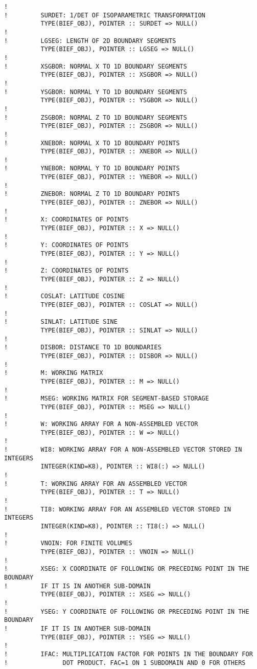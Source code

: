 \begin{lstlisting}[language=TelFortran]
!
!         SURDET: 1/DET OF ISOPARAMETRIC TRANSFORMATION
          TYPE(BIEF_OBJ), POINTER :: SURDET => NULL()
!
!         LGSEG: LENGTH OF 2D BOUNDARY SEGMENTS
          TYPE(BIEF_OBJ), POINTER :: LGSEG => NULL()
!
!         XSGBOR: NORMAL X TO 1D BOUNDARY SEGMENTS
          TYPE(BIEF_OBJ), POINTER :: XSGBOR => NULL()
!
!         YSGBOR: NORMAL Y TO 1D BOUNDARY SEGMENTS
          TYPE(BIEF_OBJ), POINTER :: YSGBOR => NULL()
!
!         ZSGBOR: NORMAL Z TO 1D BOUNDARY SEGMENTS
          TYPE(BIEF_OBJ), POINTER :: ZSGBOR => NULL()
!
!         XNEBOR: NORMAL X TO 1D BOUNDARY POINTS
          TYPE(BIEF_OBJ), POINTER :: XNEBOR => NULL()
!
!         YNEBOR: NORMAL Y TO 1D BOUNDARY POINTS
          TYPE(BIEF_OBJ), POINTER :: YNEBOR => NULL()
!
!         ZNEBOR: NORMAL Z TO 1D BOUNDARY POINTS
          TYPE(BIEF_OBJ), POINTER :: ZNEBOR => NULL()
!
!         X: COORDINATES OF POINTS
          TYPE(BIEF_OBJ), POINTER :: X => NULL()
!
!         Y: COORDINATES OF POINTS
          TYPE(BIEF_OBJ), POINTER :: Y => NULL()
!
!         Z: COORDINATES OF POINTS
          TYPE(BIEF_OBJ), POINTER :: Z => NULL()
!
!         COSLAT: LATITUDE COSINE
          TYPE(BIEF_OBJ), POINTER :: COSLAT => NULL()
!
!         SINLAT: LATITUDE SINE
          TYPE(BIEF_OBJ), POINTER :: SINLAT => NULL()
!
!         DISBOR: DISTANCE TO 1D BOUNDARIES
          TYPE(BIEF_OBJ), POINTER :: DISBOR => NULL()
!
!         M: WORKING MATRIX
          TYPE(BIEF_OBJ), POINTER :: M => NULL()
!
!         MSEG: WORKING MATRIX FOR SEGMENT-BASED STORAGE
          TYPE(BIEF_OBJ), POINTER :: MSEG => NULL()
!
!         W: WORKING ARRAY FOR A NON-ASSEMBLED VECTOR
          TYPE(BIEF_OBJ), POINTER :: W => NULL()
!
!         WI8: WORKING ARRAY FOR A NON-ASSEMBLED VECTOR STORED IN INTEGERS
          INTEGER(KIND=K8), POINTER :: WI8(:) => NULL()
!
!         T: WORKING ARRAY FOR AN ASSEMBLED VECTOR
          TYPE(BIEF_OBJ), POINTER :: T => NULL()
!
!         TI8: WORKING ARRAY FOR AN ASSEMBLED VECTOR STORED IN INTEGERS
          INTEGER(KIND=K8), POINTER :: TI8(:) => NULL()
!
!         VNOIN: FOR FINITE VOLUMES
          TYPE(BIEF_OBJ), POINTER :: VNOIN => NULL()
!
!         XSEG: X COORDINATE OF FOLLOWING OR PRECEDING POINT IN THE BOUNDARY
!         IF IT IS IN ANOTHER SUB-DOMAIN
          TYPE(BIEF_OBJ), POINTER :: XSEG => NULL()
!
!         YSEG: Y COORDINATE OF FOLLOWING OR PRECEDING POINT IN THE BOUNDARY
!         IF IT IS IN ANOTHER SUB-DOMAIN
          TYPE(BIEF_OBJ), POINTER :: YSEG => NULL()
!
!         IFAC: MULTIPLICATION FACTOR FOR POINTS IN THE BOUNDARY FOR
!               DOT PRODUCT. FAC=1 ON 1 SUBDOMAIN AND 0 FOR OTHERS

\end{lstlisting}

